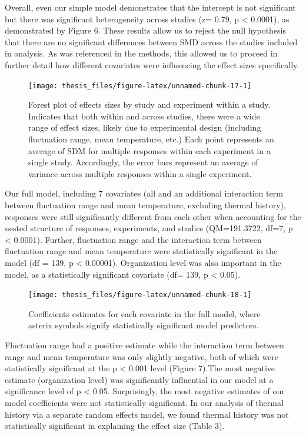 \documentclass[12pt,twoside]{reedthesis}
\begin{document}
Overall, even our simple model demonstrates that the intercept is not significant but there was significant heterogeneity across studies (z= 0.79, p \textless{} 0.0001), as demonstrated by Figure 6. These results allow us to reject the null hypothesis that there are no significant differences between SMD across the studies included in analysis. As was referenced in the methods, this allowed us to proceed in further detail how different covariates were influencing the effect sizes specifically.
\begin{figure}
\texttt{[image: thesis\_files/figure-latex/unnamed-chunk-17-1]} \caption{Forest plot of effects sizes by study and experiment within a study. Indicates that both within and across studies, there were a wide range of effect sizes, likely due to experimental design (including fluctuation range, mean temperature, etc.) Each point represents an average of SDM for multiple responses within each experiment in a single study. Accordingly, the error bars represent an average of variance across multiple responses within a single experiment.}\label{fig:unnamed-chunk-17}
\end{figure}
Our full model, including 7 covariates (all and an additional interaction term between fluctuation range and mean temperature, excluding thermal history), responses were still significantly different from each other when accounting for the nested structure of responses, experiments, and studies (QM=191.3722, df=7, p \textless{} 0.0001). Further, fluctuation range and the interaction term between fluctuation range and mean temperature were statistically significant in the model (df = 139, p \textless{} 0.00001). Organization level was also important in the model, as a statistically significant covariate (df= 139, p \textless{} 0.05).
\begin{figure}
\texttt{[image: thesis\_files/figure-latex/unnamed-chunk-18-1]} \caption{Coefficients estimates for each covariate in the full model, where asterix symbols signify statistically significant model predictors.}\label{fig:unnamed-chunk-18}
\end{figure}
Fluctuation range had a positive estimate while the interaction term between range and mean temperature was only slightly negative, both of which were statistically significant at the p \textless{} 0.001 level (Figure 7).The most negative estimate (organization level) was significantly influential in our model at a significance level of p \textless{} 0.05. Surprisingly, the most negative estimates of our model coefficients were not statistically significant. In our analysis of thermal history via a separate random effects model, we found thermal history was not statistically significant in explaining the effect size (Table 3).
\end{document}

